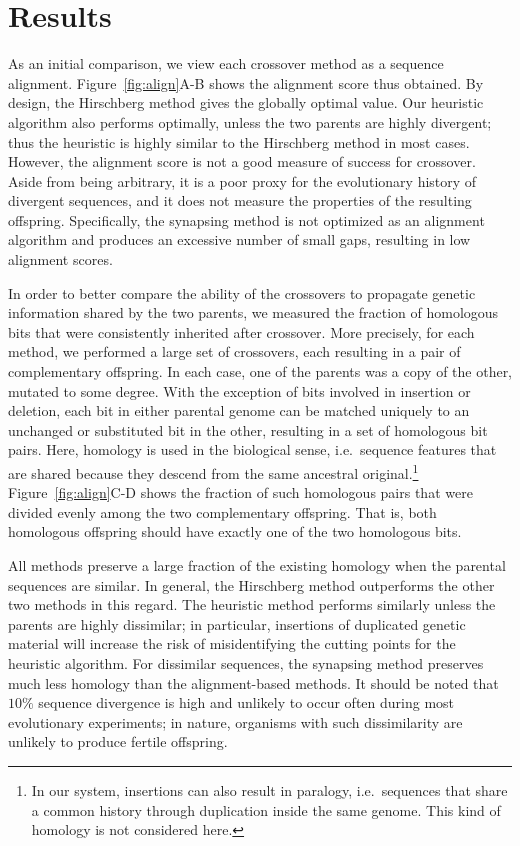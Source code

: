 \documentclass[10pt]{article}
\renewcommand{\paragraph}[1]{\textbf{#1}\hspace{2ex}}
\renewcommand{\paragraph}[1]{}
\begin{document}
\section{Results}

\paragraph{Preservation of homology} As an initial comparison, we view each
crossover method as a sequence alignment. Figure~\ref{fig:align}A-B shows the
alignment score thus obtained. By design, the Hirschberg method gives the globally
optimal value. Our heuristic algorithm also performs optimally, unless the two parents are
highly divergent; thus the heuristic is highly similar to the
Hirschberg method in most cases. However, the alignment score is not a good measure
of success for crossover. Aside from being arbitrary, it is a poor proxy for the evolutionary
history of divergent sequences, and it does not measure the properties of the resulting offspring.
Specifically, the synapsing method is not optimized as an alignment algorithm and produces
an excessive number of small gaps, resulting in low alignment scores.

In order to better compare the ability of the crossovers to propagate
genetic information shared by the two parents, we measured the fraction of homologous
bits that were consistently inherited after crossover.
More precisely, for each method, we performed a large set of crossovers,
each resulting in a pair of complementary offspring. In each case, one of the
parents was a copy of the other, mutated to some degree. With the exception of
bits involved in insertion or deletion, each bit in either parental genome can be
matched uniquely to an unchanged or substituted bit in the other, resulting in
a set of homologous bit pairs. Here, homology is used in the biological sense,
i.e.\ sequence features that are shared because they descend from the same ancestral
original.\footnote{In our system, insertions can also result in paralogy, i.e.\ sequences that share a common history
through duplication inside the same genome. This kind of homology is not considered here.}
Figure~\ref{fig:align}C-D shows
the fraction of such homologous pairs that were divided evenly among the two
complementary offspring. That is, both homologous offspring should have exactly
one of the two homologous bits.

All methods preserve a large fraction of the existing homology when the parental
sequences are similar. In general, the Hirschberg method outperforms the other
two methods in this regard. The heuristic method performs similarly unless the parents are highly dissimilar;
in particular, insertions of duplicated genetic material will increase the risk
of misidentifying the cutting points for the heuristic algorithm.
For dissimilar sequences, the synapsing method preserves much less homology than
the alignment-based methods.
It should be noted that $10\%$ sequence divergence is high and unlikely to occur
often during most evolutionary experiments; in nature, organisms with such
dissimilarity are unlikely to produce fertile offspring.
\end{document}
